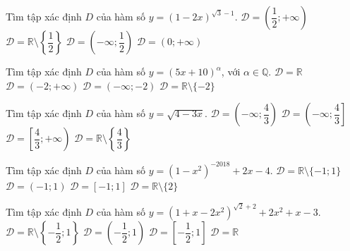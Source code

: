 \begin{ex}%
	Tìm tập xác định $D$ của hàm số $y=(1-2x)^{\sqrt{3}-1}$. 
	\choice
	{$\mathscr{D}=\left(\dfrac{1}{2};+\infty\right)$}
	{$\mathscr{D}=\mathbb{R}\setminus\left\{\dfrac{1}{2}\right\}$}
	{\True $\mathscr{D}=\left(-\infty;\dfrac{1}{2}\right)$}
	{$\mathscr{D}=(0;+\infty)$}
\end{ex}
\begin{ex}%
	Tìm tập xác định $D$ của hàm số $y=(5x+10)^{\alpha}$, với $\alpha\in\mathbb{Q}$. 
	\choice
	{$\mathscr{D}=\mathbb{R}$}
	{\True $\mathscr{D}=(-2;+\infty)$}
	{$\mathscr{D}=(-\infty;-2)$}
	{$\mathscr{D}=\mathbb{R}\setminus\{-2\}$}
\end{ex}
\begin{ex}%
	Tìm tập xác định $D$ của hàm số $y=\sqrt{4-3x}$. 
	\choice
	{$\mathscr{D}=\left(-\infty;\dfrac{4}{3}\right)$}
	{\True $\mathscr{D}=\left(-\infty;\dfrac{4}{3}\right]$}
	{$\mathscr{D}=\left[\dfrac{4}{3};+\infty\right)$}
	{$\mathscr{D}=\mathbb{R}\setminus\left\{\dfrac{4}{3}\right\}$}
	\loigiai{
		Hàm số xác định khi và chỉ khi $4-3x\geq 0\Leftrightarrow x\in\left(-\infty;\dfrac{4}{3}\right]$.}
\end{ex}
\begin{ex}%
	Tìm tập xác định $D$ của hàm số $y=\left(1-x^2\right)^{-2018}+2x-4$. 
	\choice
	{\True $\mathscr{D}=\mathbb{R}\setminus\{-1; 1\}$}
	{$\mathscr{D}=(-1; 1)$}
	{$\mathscr{D}=[-1; 1]$}
	{$\mathscr{D}=\mathbb{R}\setminus\{2\}$}
\end{ex}
\begin{ex}%
	Tìm tập xác định $D$ của hàm số $y=\left(1+x-2x^2\right)^{\sqrt{2}+2}+2x^2+x-3$. 
	\choice
	{$\mathscr{D}=\mathbb{R}\setminus\left\{-\dfrac{1}{2}; 1\right\}$}
	{\True $\mathscr{D}=\left(-\dfrac{1}{2}; 1\right)$}
	{$\mathscr{D}=\left[-\dfrac{1}{2}; 1\right]$}
	{$\mathscr{D}=\mathbb{R}$}
\end{ex}
